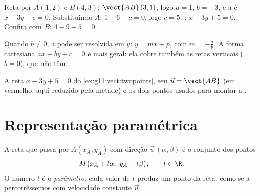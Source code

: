 \begin{example}\label{ex:g11:vect:twopoints}
Reta por $A(1, 2)$ e $B(4, 3)$: $\vect{AB}\,(3, 1)$, logo $a = 1$,
$b = -3$, e a  é $x - 3y + c = 0$. Substituindo $A$:
$1 - 6 + c = 0$, logo $c = 5$. : $x - 3y + 5 = 0$. Confira com
$B$: $4 - 9 + 5 = 0$.
\end{example}

\begin{remark}
Quando $b \neq 0$, a  pode ser resolvida em $y$: $y = mx + p$, com
 $m = -\frac ab$. A forma cartesiana
$ax + by + c = 0$ é mais geral: ela cobre também as retas verticais
($b = 0$), que não têm .
\end{remark}

\begin{omfigure}

{\small A reta $x - 3y + 5 = 0$ do \cref{ex:g11:vect:twopoints}, seu
 $\vec u = \vect{AB}$ (em vermelho, aqui reduzido pela
metade) e os dois pontos usados para montar a .}
\end{omfigure}

\section{Representação paramétrica}

\begin{definition}\label{def:g11:vect:parametric}
A reta que passa por $A(x_A, y_A)$ com direção $\vec u\,(\alpha, \beta)$
é o conjunto dos pontos
\[
M\bigl(x_A + t\alpha,\ y_A + t\beta\bigr), \qquad t \in \R .
\]
O número $t$ é o \emph{parâmetro}: cada valor de $t$ produz um ponto da
reta, como se a percorrêssemos com velocidade constante $\vec u$.
\end{definition}

